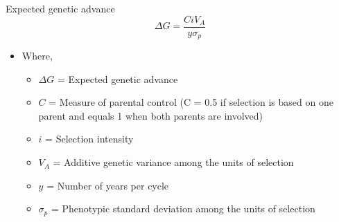 \documentclass[11pt,ignorenonframetext,aspectratio=169]{beamer}
\providecommand{\tightlist}{%
  \setlength{\itemsep}{0pt}\setlength{\parskip}{0pt}}
\begin{document}
\begin{frame}{Expected genetic advance}
\protect\hypertarget{expected-genetic-advance-1}{}
\[\Delta G = \frac{CiV_A}{y \sigma_p}\]

\begin{itemize}
\tightlist
\item
  Where,

  \begin{itemize}
  \tightlist
  \item
    \(\Delta G\) = Expected genetic advance
  \item
    \(C\) = Measure of parental control (C = 0.5 if selection is based
    on one parent and equals 1 when both parents are involved)
  \item
    \(i\) = Selection intensity
  \item
    \(V_A\) = Additive genetic variance among the units of selection
  \item
    \(y\) = Number of years per cycle
  \item
    \(\sigma_p\) = Phenotypic standard deviation among the units of
    selection
  \end{itemize}
\end{itemize}
\end{frame}
\end{document}
